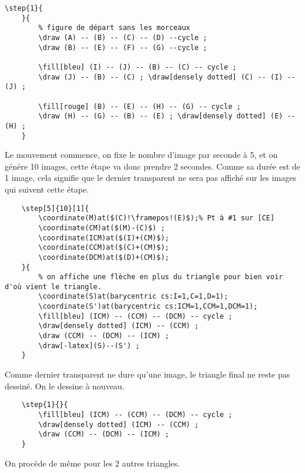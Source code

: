 \documentclass[a4paper,12pt]{article}
\begin{document}
\begin{lstlisting}[name=exemplecomplet]
	\step{1}{
	}{
		% figure de départ sans les morceaux
		\draw (A) -- (B) -- (C) -- (D) --cycle ;
		\draw (B) -- (E) -- (F) -- (G) --cycle ;
		
		\fill[bleu] (I) -- (J) -- (B) -- (C) -- cycle ;
		\draw (J) -- (B) -- (C) ; \draw[densely dotted] (C) -- (I) -- (J) ;
			
		\fill[rouge] (B) -- (E) -- (H) -- (G) -- cycle ;
		\draw (H) -- (G) -- (B) -- (E) ; \draw[densely dotted] (E) -- (H) ;
	}
\end{lstlisting}
Le mouvement commence, on fixe le nombre d'image par seconde à 5, et on génére 10 images, cette étape va donc prendre 2 secondes. Comme sa durée est de 1 image, cela signifie 
que le dernier transparent ne sera pas affiché sur les images qui suivent cette étape.
\begin{lstlisting}[name=exemplecomplet]
	% déplacement du premier triangle
	\step[5]{10}[1]{
		\coordinate(M)at($(C)!\framepos!(E)$);% Pt à #1 sur [CE]
		\coordinate(CM)at($(M)-(C)$) ;
		\coordinate(ICM)at($(I)+(CM)$);
		\coordinate(CCM)at($(C)+(CM)$);
		\coordinate(DCM)at($(D)+(CM)$);
	}{
		% on affiche une flèche en plus du triangle pour bien voir d'où vient le triangle.
		\coordinate(S)at(barycentric cs:I=1,C=1,D=1);
		\coordinate(S')at(barycentric cs:ICM=1,CCM=1,DCM=1);
		\fill[bleu] (ICM) -- (CCM) -- (DCM) -- cycle ;
		\draw[densely dotted] (ICM) -- (CCM) ;
		\draw (CCM) -- (DCM) -- (ICM) ;
		\draw[-latex](S)--(S') ;
	}
\end{lstlisting}

Comme dernier transparent ne dure qu'une image, le triangle final ne reste pas dessiné. On le dessine à nouveau.

\begin{lstlisting}[name=exemplecomplet]
	% position finale
	\step{1}{}{
		\fill[bleu] (ICM) -- (CCM) -- (DCM) -- cycle ;
		\draw[densely dotted] (ICM) -- (CCM) ;
		\draw (CCM) -- (DCM) -- (ICM) ;
	}
\end{lstlisting}

On procède de même pour les 2 autres triangles.
\end{document}

